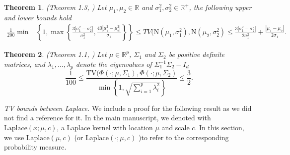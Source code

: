 \documentclass{article}
\newtheorem{theorem}{Theorem}
\theoremstyle{definition}
\renewcommand{\&}{and}
\begin{document}
\begin{theorem}\label{thm:devroye_univariate}(Theorem 1.3, \cite{devroye2018total}) Let $\mu_1,\mu_2 \in \mathbb{R}$ and $\sigma^2_1,\sigma^2_2 \in \mathbb{R}^+$, the following upper and lower bounds hold
\begin{align*}
\frac{1}{200} \min &\left\{1,  \max \left\{\frac{3|\sigma^2_1-\sigma^2_2|}{\sigma^{2}_{1}}, \frac{40|\mu^2_1-\mu^2_2|}{\sigma_{1}} \right\} \right\}   \leq  TV (\text{N}(\mu_1, \sigma^2_1),\text{N}( \mu_2, \sigma^2_2) \leq \frac{3|\sigma^2_1-\sigma^2_2|}{2\sigma^2_1}+\frac{|\mu_1-\mu_2|}{2\sigma_1}.
\end{align*}
\end{theorem}

\begin{theorem}\label{thm:devroye_multivariate}(Theorem 1.1, \cite{devroye2018total}) Let $\mu \in \mathbb{R}^p$, $\Sigma_1$ and $\Sigma_2$ be positive definite matrices, and $\lambda_1,\ldots,\lambda_p$ denote the eigenvalues of $\Sigma_1^{-1}\Sigma_2-I_d$
\[
\frac{1}{100}  \leq \frac{\text{TV} (\Phi(\cdot; \mu, \Sigma_1),\Phi(\cdot; \mu, \Sigma_2)}{\min\left\{1,\sqrt{\sum_{i=1}^p \lambda_i^2} \right\}} \leq \frac{3}{2}.
\]    
\end{theorem}


\noindent \textit{TV bounds between Laplace.} We include a proof for the following result as we did not find a reference for it. In the main manuscript, we denoted with $\text{Laplace}(x;\mu,c)$, a Laplace kernel with location $\mu$ and scale $c$. In this section, we use $\text{Laplace}(\mu,c)$ (or $\text{Laplace}(\cdot;\mu,c)$ )to refer to the corresponding probability measure. 
\end{document}

